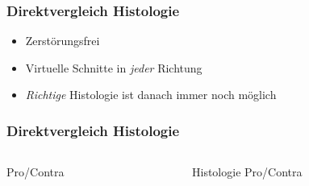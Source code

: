 \begin{frame}
	\frametitle{Direktvergleich Histologie \leftrightarrow \uct}
	\begin{itemize}
		\item Zerstörungsfrei
		\item Virtuelle Schnitte in \emph{jeder} Richtung
		\item \emph{Richtige} Histologie ist danach immer noch möglich
	\end{itemize}
\end{frame}

\begin{frame}[label=current]
	\frametitle{Direktvergleich Histologie \leftrightarrow \uct}
		\begin{columns}
			\begin{column}{0.49\linewidth}
				\uct Pro/Contra
 			\end{column}
 			\begin{column}{0.49\linewidth}
 				Histologie Pro/Contra
 			\end{column}
 		\end{columns}
\end{frame}


